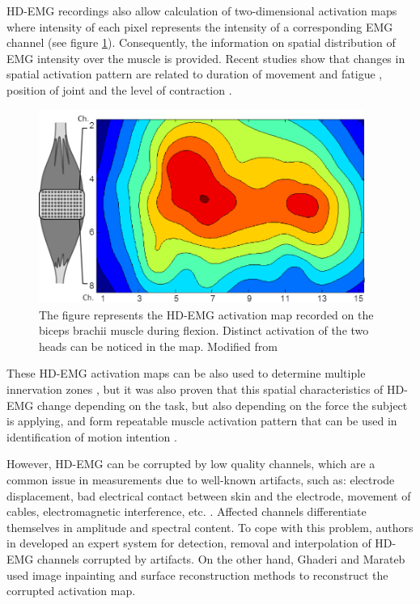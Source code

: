 HD-EMG recordings also allow calculation of two-dimensional activation maps where intensity of each pixel represents the intensity of a corresponding EMG channel (see figure \ref{fig:HD-EMG}). Consequently, the information on spatial distribution of EMG intensity over the muscle is provided. Recent studies show that changes in spatial activation pattern are related to duration of movement and fatigue \citep{Tucker2009, Staudenmann2014}, position of joint \citep{Vieira2010} and the level of contraction \citep{Holtermann2005}. 
\begin{figure}[ht]
\centering
\includegraphics[width=0.95\textwidth]{Images/introduction/HD-EMG.png}
\caption{The figure represents the HD-EMG activation map recorded on the biceps brachii muscle during flexion. Distinct activation of the two heads can be noticed in the map. Modified from \citep{Monica-thesis}}
\label{fig:HD-EMG}
\end{figure}

These HD-EMG activation maps can be also used to determine multiple innervation zones \citep{Marateb2016}, but it was also proven that this spatial characteristics of HD-EMG change depending on the  task, but also depending on the force the subject is applying, and form repeatable muscle activation pattern that can be used in identification of motion intention \citep{Rojas-Martinez2012}.

However, HD-EMG can be corrupted by low quality channels, which are a common issue in measurements due to well-known artifacts, such as: electrode displacement, bad electrical contact between skin and the electrode, movement of cables, electromagnetic interference, etc. \citep{Clancy2002b}. Affected channels differentiate themselves in amplitude and spectral content. To cope with this problem, authors in \citep{Rojas-Martinez2012} developed an expert system for detection, removal and interpolation of HD-EMG channels corrupted by artifacts. On the other hand, Ghaderi and Marateb \citep{Ghaderi2017} used image inpainting and surface reconstruction methods to reconstruct the corrupted activation map.


